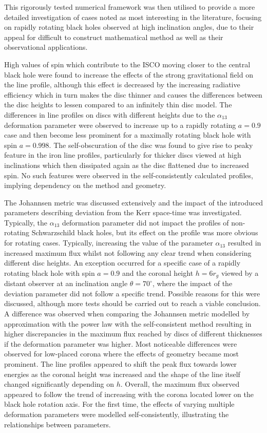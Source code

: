 \documentclass[fleqn,usenatbib,useAMS]{mnras}
\begin{document}
This rigorously tested numerical framework was then utilised to provide a more detailed investigation of cases noted as most interesting in the literature, focusing on rapidly rotating black holes observed at high inclination angles, due to their appeal for difficult to construct mathematical method as well as their observational applications.

High values of spin which contribute to the ISCO moving closer to the central black hole were found to increase the effects of the strong gravitational field on the line profile, although this effect is decreased by the increasing radiative efficiency which in turn makes the disc thinner and causes the differences between the disc heights to lessen compared to an infinitely thin disc model. The differences in line profiles on discs with different heights due to the $\alpha_{13}$ deformation parameter were observed to increase up to a rapidly rotating $a = 0.9$ case and then become less prominent for a maximally rotating black hole with spin $a = 0.998$. The self-obscuration of the disc was found to give rise to peaky feature in the iron line profiles, particularly for thicker discs viewed at high inclinations which then dissipated again as the disc flattened due to increased spin. No such features were observed in the self-consistently calculated profiles, implying dependency on the method and geometry. 

The Johannsen metric was discussed extensively and the impact of the introduced parameters describing deviation from the Kerr space-time was investigated. Typically, the $\alpha_{13}$ deformation parameter did not impact the profiles of non-rotating Schwarzschild black holes, but its effect on the profile was more obvious for rotating cases. Typically, increasing the value of the parameter $\alpha_{13}$ resulted in increased maximum flux whilst not following any clear trend when considering different disc heights. An exception occurred for a specific case of a rapidly rotating black hole with spin $a = 0.9$ and the coronal height $h = 6 r_{g}$ viewed by a distant observer at an inclination angle $\theta = 70^{\circ}$, where the impact of the deviation parameter did not follow a specific trend. Possible reasons for this were discussed, although more tests should be carried out to reach a viable conclusion.
A difference was observed when comparing the Johannsen metric modelled by approximation with the power law with the self-consistent method resulting in higher discrepancies in the maximum flux reached by discs of different thicknesses if the deformation parameter was higher. Most noticeable differences were observed for low-placed corona where the effects of geometry became most prominent. The line profiles appeared to shift the peak flux towards lower energies as the coronal height was increased and the shape of the line itself changed significantly depending on $h$. Overall, the maximum flux observed appeared to follow the trend of increasing with the corona located lower on the black hole rotation axis. For the first time, the effects of varying multiple deformation parameters were modelled self-consistently, illustrating the relationships between parameters. 
\end{document}
